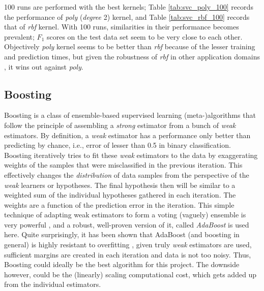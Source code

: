 \documentclass{article}
\begin{document}
	100 runs are performed with the best kernels; Table \ref{tab:svc_poly_100} records the performance of \emph{poly} (\emph{degree} 2) kernel, and Table \ref{tab:svc_rbf_100} records that of \emph{rbf} kernel. With 100 runs, similarities in their performance becomes prevalent; $F_1$ scores on the test data set seem to be very close to each other. Objectively \emph{poly} kernel seems to be better than \emph{rbf} because of the lesser training and prediction times, but given the robustness of \emph{rbf} in other application domains \cite{hsu2003}, it wins out against \emph{poly}.  
	
	\subsection{Boosting}
	
	Boosting is a class of ensemble-based supervised learning (meta-)algorithms that follow the principle of assembling a \emph{strong} estimator from a bunch of \emph{weak} estimators. By definition, a \emph{weak} estimator has a performance only better than predicting by chance, i.e., error of lesser than 0.5 in binary classification. Boosting iteratively tries to fit these \emph{weak} estimators to the data by exaggerating weights of the samples that were misclassified in the previous iteration. This effectively changes the \emph{distribution} of data samples from the perspective of the \emph{weak} learners or hypotheses. The final hypothesis then will be similar to a weighted sum of the individual hypotheses gathered in each iteration. The weights are a function of the prediction error in the iteration. This simple technique of adapting weak estimators to form a voting (vaguely) ensemble is very powerful \cite{shapire1990}, and a robust, well-proven version of it, called \emph{AdaBoost} \cite{Freund1997} is used here. Quite surprisingly, it has been shown that AdaBoost (and boosting in general) is highly resistant to overfitting \cite{Schapire2013}, given truly \emph{weak} estimators are used, sufficient margins are created in each iteration and data is not too noisy. Thus, Boosting could ideally be the best algorithm for this project. The downside however, could be the (linearly) scaling computational cost, which gets added up from the individual estimators.
	
\end{document}
